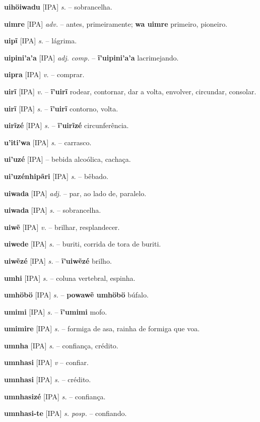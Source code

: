 \textbf{uihöiwadu} [IPA] \textit{s.} -- sobrancelha.

\textbf{uimre} [IPA] \textit{adv.} -- antes, primeiramente; 
\textbf{wa uimre} primeiro, pioneiro.

\textbf{uipĩ} [IPA] \textit{s.} -- lágrima.

\textbf{uipini'a'a} [IPA] \textit{adj. comp.} -- \textbf{ĩ'uipini'a'a} lacrimejando.

\textbf{uipra} [IPA] \textit{v.} -- comprar.

\textbf{uirĩ} [IPA] \textit{v.} -- \textbf{ĩ'uirĩ} rodear, contornar, dar a volta, envolver, circundar, consolar.

\textbf{uirĩ} [IPA] \textit{s.} -- \textbf{ĩ'uirĩ} contorno, volta.

\textbf{uirĩzé} [IPA] \textit{s.} -- \textbf{ĩ'uirĩzé} circunferência.

\textbf{u'iti'wa} [IPA] \textit{s.} -- carrasco.

\textbf{ui'uzé} [IPA] \textit{} -- bebida alcoólica, cachaça.

\textbf{ui'uzénhipãri} [IPA] \textit{s.} -- bêbado.

\textbf{uiwada} [IPA] \textit{adj.} -- par, ao lado de, paralelo.

\textbf{uiwada} [IPA] \textit{s.} -- sobrancelha.

\textbf{uiwẽ} [IPA] \textit{v.} -- brilhar, resplandecer.

\textbf{uiwede} [IPA] \textit{s.} -- buriti, corrida de tora de buriti.

\textbf{uiwẽzé} [IPA] \textit{s.} -- \textbf{ĩ'uiwẽzé} brilho.

\textbf{umhi} [IPA] \textit{s.} -- coluna vertebral, espinha.

\textbf{umhöbö} [IPA] \textit{s.} -- \textbf{powawẽ umhöbö} búfalo.

\textbf{umimi} [IPA] \textit{s.} -- \textbf{ĩ'umimi} mofo.

\textbf{umimire} [IPA] \textit{s.} -- formiga de asa, rainha de formiga que voa.

\textbf{umnha} [IPA] \textit{s.} -- confiança, crédito.

\textbf{umnhasi} [IPA] \textit{v} -- confiar.

\textbf{umnhasi} [IPA] \textit{s.} -- crédito.

\textbf{umnhasizé} [IPA] \textit{s.} -- confiança.

\textbf{umnhasi-te} [IPA] \textit{s. posp.} -- confiando.

